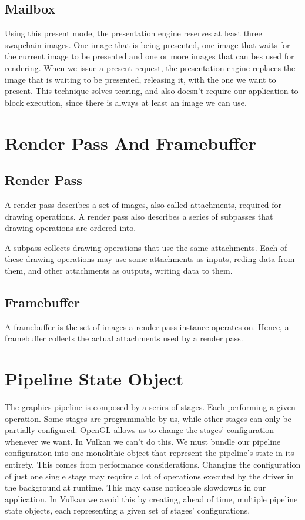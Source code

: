 \subsection{Mailbox}

Using this present mode, the presentation engine reserves at least three
swapchain images.
One image that is being presented, one image that waits for the current image
to be presented and one or more images that can bes used for rendering.
When we issue a present request, the presentation engine replaces the
image that is waiting to be presented, releasing it, with the one we want
to present.
This technique solves tearing, and also doesn't require our application to
block execution, since there is always at least an image we can use.

\section{Render Pass And Framebuffer}

\subsection{Render Pass}

A render pass describes a set of images, also called attachments, required
for drawing operations.
A render pass also describes a series of subpasses that drawing operations
are ordered into.

A subpass collects drawing operations that use the same attachments.
Each of these drawing operations may use some attachments as inputs,
reding data from them, and other attachments as outputs, writing data to them.

\subsection{Framebuffer}

A framebuffer is the set of images a render pass instance operates on.
Hence, a framebuffer collects the actual attachments used by a render pass.

\section{Pipeline State Object}

The graphics pipeline is composed by a series of stages.
Each performing a given operation.
Some stages are programmable by us, while other stages can only be
partially configured.
OpenGL allows us to change the stages' configuration whenever we want.
In Vulkan we can't do this.
We must bundle our pipeline configuration into one monolithic object
that represent the pipeline's state in its entirety.
This comes from performance considerations.
Changing the configuration of just one single stage may require a lot of
operations executed by the driver in the background at runtime.
This may cause noticeable slowdowns in our application.
In Vulkan we avoid this by creating, ahead of time, multiple pipeline state
objects, each representing a given set of stages' configurations.

